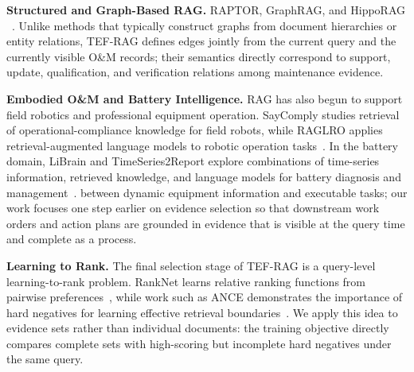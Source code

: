 \textbf{Structured and Graph-Based RAG.}
RAPTOR, GraphRAG, and HippoRAG ~\cite{sarthi2024raptor,edge2024graphrag,gutierrez2024hipporag}. Unlike methods that typically construct graphs from document hierarchies or entity relations, TEF-RAG defines edges jointly from the current query and the currently visible O\&M records; their semantics directly correspond to support, update, qualification, and verification relations among maintenance evidence.

\textbf{Embodied O\&M and Battery Intelligence.}
RAG has also begun to support field robotics and professional equipment operation. SayComply studies retrieval of operational-compliance knowledge for field robots, while RAGLRO applies retrieval-augmented language models to robotic operation tasks~\cite{ginting2025saycomply,wang2026raglro}. In the battery domain, LiBrain and TimeSeries2Report explore combinations of time-series information, retrieved knowledge, and language models for battery diagnosis and management~\cite{li2026librain,yang2026timeseries2report}. %
 between dynamic equipment information and executable tasks; our work focuses one step earlier on evidence selection so that downstream work orders and action plans are grounded in evidence that is visible at the query time and complete as a process.

\textbf{Learning to Rank.}
The final selection stage of TEF-RAG is a query-level learning-to-rank problem. RankNet learns relative ranking functions from pairwise preferences~\cite{burges2005ranknet}, while work such as ANCE demonstrates the importance of hard negatives for learning effective retrieval boundaries~\cite{xiong2021ance}. We apply this idea to evidence sets rather than individual documents: the training objective directly compares complete sets with high-scoring but incomplete hard negatives under the same query.
